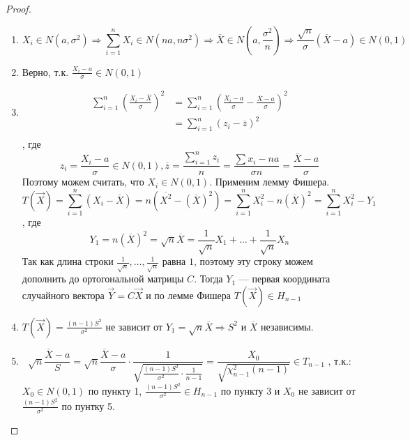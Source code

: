 \begin{proof}\itemfix
    \begin{enumerate}
        \item \[X_i \in N(a, \sigma^2) \Rightarrow \sum_{i=1}^{n} X_i \in N(na, n\sigma^2) \Rightarrow \overline{X} \in N\left(a, \frac{\sigma^2}{n}\right) \Rightarrow \frac{\sqrt{n}}{\sigma}(\overline{X} - a) \in N(0, 1)\]
        \item Верно, т.к. \(\frac{X_i - a}{\sigma} \in N(0, 1)\)
        \item \begin{align*}
                  \sum_{i=1}^{n} \left(\frac{X_i - \overline{X}}{\sigma}\right)^2 & = \sum_{i=1}^{n} \left(\frac{X_i - a}{\sigma} - \frac{ \overline{X} - a}{\sigma}\right)^2 \\
                                                                                  & = \sum_{i=1}^{n} (z_i - \overline{z})^2                                                   \\
              \end{align*}
              , где \[z_i = \frac{X_i - a}{\sigma} \in N(0, 1), \overline{z} = \frac{\sum_{i=1}^{n} z_i}{n} = \frac{\sum x_i - na}{\sigma n}= \frac{ \overline{X} - a}{\sigma}\]
              Поэтому можем считать, что \(X_i \in N(0, 1)\). Применим лемму Фишера.
              \[T(\vec{X}) = \sum_{i=1}^{n} \left(X_i - \overline{X}\right) = n (\overline{X^2} - (\overline{X})^2) = \sum_{i=1}^{n} X_i^2 - n (\overline{X})^2 = \sum_{i=1}^{n} X_i^2 - Y_1\]
              , где
              \[Y_1 = n(\overline{X})^2 = \sqrt{n} \overline{X} = \frac{1}{\sqrt{n}} X_1 + \dots + \frac{1}{\sqrt{n}} X_n\]
              Так как длина строки \(\frac{1}{\sqrt{n}}, \dots , \frac{1}{\sqrt{n}}\) равна \(1\), поэтому эту строку можем дополнить до ортогональной матрицы \(C\). Тогда \(Y_1\) --- первая координата случайного вектора \(\vec{Y} = C \vec{X}\) и по лемме Фишера \(T(\vec{X}) \in H_{n - 1}\) \setcounter{enumi}{4}
        \item \(T(\vec{X}) = \frac{(n - 1)S^2}{\sigma^2}\) не зависит от \(Y_1 = \sqrt{n} \overline{X} \Rightarrow S^2\) и \(\overline{X}\) независимы. \setcounter{enumi}{3}
        \item \[\sqrt{n} \frac{ \overline{X} - a}{S} = \sqrt{n} \frac{\overline{X} - a}{\sigma} \cdot \frac{1}{\sqrt{\frac{(n - 1)S^2}{\sigma^2} \cdot \frac{1}{n - 1}}} = \frac{X_0}{\sqrt{\chi_{n - 1}^2 (n - 1)}} \in T_{n - 1} \text{ , т.к.:}\]
              \(X_0 \in N(0, 1)\) по пункту 1, \(\frac{(n - 1)S^2}{\sigma^2} \in H_{n-1}\) по пункту 3 и \(X_0\) не зависит от \(\frac{(n - 1)S^2}{\sigma^2}\) по пунтку 5.
    \end{enumerate}
\end{proof}


